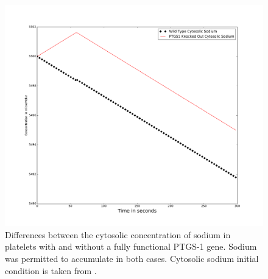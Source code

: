 \documentclass[11pt]{article}
\begin{document}
\begin{figure}
\vspace{-.5cm}
\centering
\includegraphics[scale=.25]{../figures/cytosolicNa}
\caption{Differences between the cytosolic concentration of sodium in platelets with and without a fully functional PTGS-1 gene. Sodium was permitted to accumulate in both cases. Cytosolic sodium initial condition is taken from  \cite{sage1991resting}. }
\label{fig:cytoNa}
\end{figure}
\end{document}
